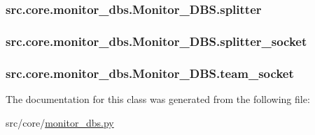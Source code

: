 \subsubsection[{splitter}]{\setlength{\rightskip}{0pt plus 5cm}src.\+core.\+monitor\+\_\+dbs.\+Monitor\+\_\+\+D\+B\+S.\+splitter}\label{classsrc_1_1core_1_1monitor__dbs_1_1Monitor__DBS_a4a80ef01a9b32917f1786b3637fa232a}
\hypertarget{classsrc_1_1core_1_1monitor__dbs_1_1Monitor__DBS_af81d83715205435bac9b104f55fe1156}{}
\subsubsection[{splitter\+\_\+socket}]{\setlength{\rightskip}{0pt plus 5cm}src.\+core.\+monitor\+\_\+dbs.\+Monitor\+\_\+\+D\+B\+S.\+splitter\+\_\+socket}\label{classsrc_1_1core_1_1monitor__dbs_1_1Monitor__DBS_af81d83715205435bac9b104f55fe1156}
\hypertarget{classsrc_1_1core_1_1monitor__dbs_1_1Monitor__DBS_aae3ea0974cb300f573270131c1ec35b0}{}
\subsubsection[{team\+\_\+socket}]{\setlength{\rightskip}{0pt plus 5cm}src.\+core.\+monitor\+\_\+dbs.\+Monitor\+\_\+\+D\+B\+S.\+team\+\_\+socket}\label{classsrc_1_1core_1_1monitor__dbs_1_1Monitor__DBS_aae3ea0974cb300f573270131c1ec35b0}


The documentation for this class was generated from the following file\+:\begin{DoxyCompactItemize}
\item 
src/core/\hyperlink{monitor__dbs_8py}{monitor\+\_\+dbs.\+py}\end{DoxyCompactItemize}
